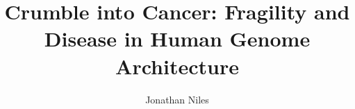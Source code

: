 
\title{Crumble into Cancer: Fragility and Disease in Human Genome Architecture}
\author{Jonathan Niles}
